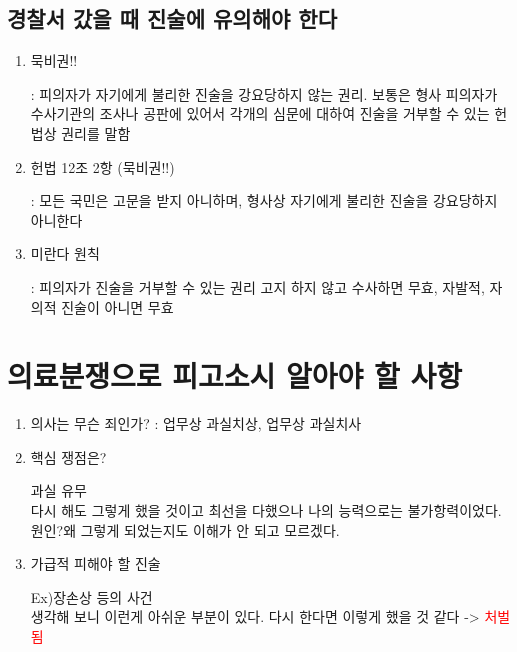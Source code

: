 \subsection{경찰서 갔을 때 진술에 유의해야 한다}
\begin{enumerate}[1)]\tightlist
\item 묵비권!!
\begin{mdframed}[linecolor=blue,middlelinewidth=2]
 :  피의자가 자기에게 불리한 진술을 강요당하지 않는 권리. 보통은 형사 피의자가 수사기관의 조사나 공판에 있어서 각개의 심문에 대하여 진술을 거부할 수 있는 헌법상 권리를 말함
\end{mdframed}
\item 헌법 12조 2항 (묵비권!!)
\begin{mdframed}[linecolor=blue,middlelinewidth=2]
 :  모든 국민은 고문을 받지 아니하며, 형사상 자기에게 불리한 진술을 강요당하지 아니한다   
\end{mdframed}
\item 미란다 원칙 
\begin{mdframed}[linecolor=blue,middlelinewidth=2]
  : 피의자가 진술을 거부할 수 있는 권리 고지 하지 않고 수사하면 무효,  자발적, 자의적 진술이 아니면 무효 
\end{mdframed}
\end{enumerate}
\section{의료분쟁으로 피고소시 알아야 할 사항 }
\begin{enumerate}[1)]\tightlist
\item 의사는 무슨 죄인가? : 
   업무상 과실치상, 업무상 과실치사 
\item 핵심 쟁점은? 
   \begin{mdframed}[linecolor=blue,middlelinewidth=2]
	과실 유무\\
   다시 해도 그렇게 했을 것이고 최선을 다했으나 나의 능력으로는 불가항력이었다.
   원인?왜 그렇게 되었는지도 이해가 안 되고 모르겠다.
   \end{mdframed}	    
\item 가급적 피해야 할 진술
   \begin{mdframed}[linecolor=blue,middlelinewidth=2]
       Ex)장손상 등의 사건\\
      생각해 보니 이런게 아쉬운 부분이 있다. 
      다시 한다면 이렇게 했을  것 같다 -> \textcolor{red}{처벌됨}
   \end{mdframed}
\end{enumerate}

